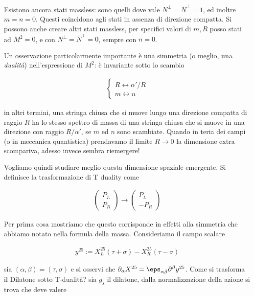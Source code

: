 \documentclass{report}
\begin{document}
Esistono ancora stati massless: sono quelli dove vale \(N^\perp = \bar{N}^\perp = 1\), ed inoltre \(m= n = 0\). Questi coincidono agli stati in assenza di direzione compatta. Si possono anche creare altri stati massless, per specifici valori di \(m, R\) posso stati ad \(M^2 = 0\), e con \(N^\perp = \bar{N}^\perp = 0\), sempre con \(n=0\). 

Un osservazione particolarmente importante è una simmetria (o meglio, una \emph{dualità}) nell'espressione di \(M^2\): è invariante sotto lo scambio 

\begin{align}
    \begin{cases}
        R \leftrightarrow \alpha'/R \\ 
        m \leftrightarrow n 
    \end{cases}
\end{align}

in altri termini, una stringa chiusa che si muove lungo una direzione compatta di raggio \(R\) ha lo stesso spettro di massa di una stringa chiusa che si muove in una direzione con raggio \(R/\alpha'\), se \(m\) ed \(n\) sono scambiate. Quando in teria dei campi (o in meccanica quantistica) prendavamo il limite \(R \to 0\) la dimensione extra scompariva, adesso invece sembra riemergere! 

Vogliamo quindi studiare meglio questa dimensione spaziale emergente. Si definisce la trasformazione di T duality come 

\begin{align}
    \begin{pmatrix}
        P_L \\ P_R
    \end{pmatrix} \to \begin{pmatrix}
        P_L \\ -P_R 
    \end{pmatrix}
\end{align}

Per prima cosa mostriamo che questo corrisponde in effetti alla simmetria che abbiamo notato nella formula della massa. Consideriamo il campo scalare 

\begin{align}
    y^{25} := X^{25}_L (\tau +\sigma) - X_R^{25}(\tau -\sigma)
\end{align}

sia \((\alpha, \beta) = (\tau, \sigma)\) e si osservi che \(\partial_\alpha X^{25} = \eps_{\alpha\beta}\partial^\beta y^{25}\). Come si trasforma il Dilatone sotto T-dualità? sia \(g_s\) il dilatone, dalla normalizzazione della azione si trova che deve valere 
\end{document}
